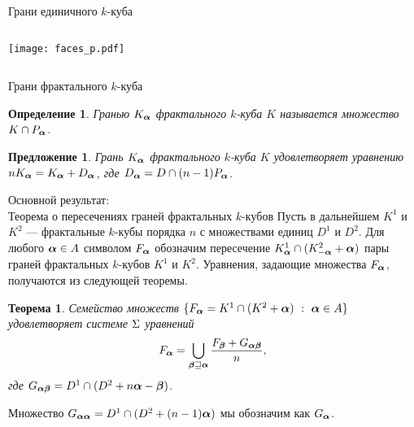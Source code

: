 \documentclass[aspectratio=1610, 10pt, notheorems]{beamer}
\newtheorem{theorem}     {Теорема}
\newtheorem{proposition} {Предложение}
\newtheorem{definition}  {Определение}
\begin{document}
\begin{frame}{Грани единичного $k$-куба}
\begin{columns}
\texttt{[image: faces\_p.pdf]}
\end{columns}
\end{frame}


\begin{frame}{Грани фрактального $k$-куба}
\begin{definition}\label{def-falpha}
Гранью $K_{\bm{\alpha}}$ фрактального $k$-куба $K$ называется множество $K\cap P_{\bm{\alpha}}$.
\end{definition}

\begin{proposition}\label{prop:Ka}
Грань $K_{\bm{\alpha}}$ фрактального $k$-куба $K$ удовлетворяет уравнению $n K_{\bm{\alpha}}=K_{\bm{\alpha}}+D_{\bm{\alpha}}$, где $D_{\bm{\alpha}}=D\cap(n-1)P_{\bm{\alpha}}$.
\end{proposition}
\end{frame}


\begin{frame}{Основной результат:\\Теорема о пересечениях граней фрактальных $k$-кубов }
Пусть в дальнейшем $K^1$ и $K^2$ --- фрактальные $k$-кубы порядка $n$ с множествами единиц $D^1$ и $D^2$.
Для любого ${\bm{\alpha}}\in A$ символом $F_{\bm{\alpha}}$ обозначим пересечение $K^1_{\bm{\alpha}}\cap(K^2_{-{\bm{\alpha}}}+{\bm{\alpha}})$ пары граней фрактальных $k$-кубов $K^1$ и $K^2$.
Уравнения, задающие множества $F_{\bm{\alpha}}$, получаются из следующей теоремы.

\begin{theorem}\label{IFC}
Семейство множеств $\{F_{\bm{\alpha}}=K^1\cap(K^2+{\bm{\alpha}})\ :\ {\bm{\alpha}}\in A\}$ удовлетворяет системе $\Sigma$ уравнений 
\begin{equation}\label{sideint}
F_{\bm{\alpha}}=\bigcup\limits_{{\bm{\beta}}\sqsupseteq{\bm{\alpha}}} 
\dfrac{F_{\bm{\beta}}+G_{{\bm{\alpha}}{\bm{\beta}}}}{n},
\end{equation}
где $G_{{\bm{\alpha}}{\bm{\beta}}}=D^1\cap(D^2+n{\bm{\alpha}}-{\bm{\beta}})$.
\end{theorem}
Множество $G_{{\bm{\alpha}}{\bm{\alpha}}}=D^1\cap(D^2+(n-1){\bm{\alpha}})$ мы обозначим как $G_{{\bm{\alpha}}}$.
\end{frame}
\end{document}
